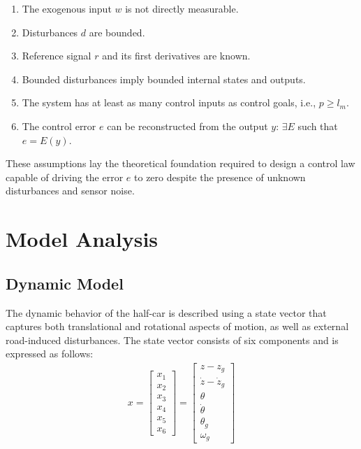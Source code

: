 \documentclass[]{report}
\begin{document}
\begin{enumerate}
	\item The exogenous input $w$ is not directly measurable.
	\item Disturbances $d$ are bounded.
	\item Reference signal $r$ and its first derivatives are known.
	\item Bounded disturbances imply bounded internal states and outputs.
	\item The system has at least as many control inputs as control goals, i.e., $p \geq l_m$.
	\item The control error $e$ can be reconstructed from the output $y$: $\exists E$ such that $e = E(y)$.
\end{enumerate}

These assumptions lay the theoretical foundation required to design a control law capable of driving the error $e$ to zero despite the presence of unknown disturbances and sensor noise.

\section{Model Analysis}
\subsection{Dynamic Model}

The dynamic behavior of the half-car is described using a state vector that captures both translational and rotational aspects of motion, as well as external road-induced disturbances. The state vector consists of six components and is expressed as follows:
\begin{align}
	x = \begin{bmatrix}
		x_1 \\ x_2 \\ x_3 \\ x_4 \\ x_5 \\ x_6
	\end{bmatrix} =
	\begin{bmatrix}
		z - z_g \\
		\dot{z} - \dot{z}_g \\
		\theta \\
		\dot{\theta} \\
		\theta_g \\
		\omega_g
	\end{bmatrix}
\end{align}
\end{document}
